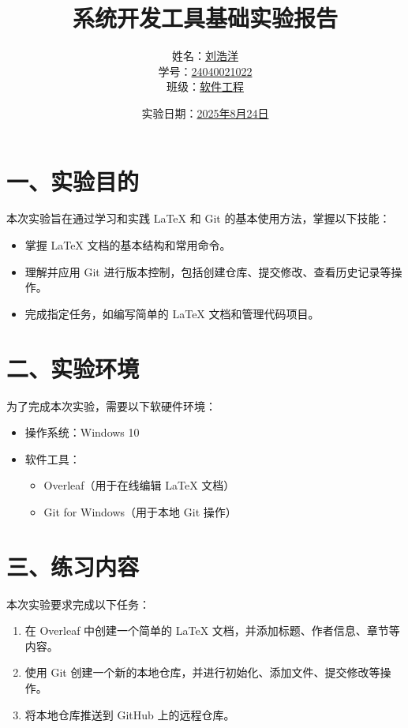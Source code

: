 \documentclass[a4paper, 12pt]{article}
\begin{document}
\title{\huge{系统开发工具基础实验报告}}
\author{姓名：\underline{刘浩洋} \\ 
        学号：\underline{24040021022} \\ 
        班级：\underline{软件工程}}
\date{实验日期：\underline{2025年8月24日}}
\maketitle

\section*{一、实验目的}
本次实验旨在通过学习和实践 LaTeX 和 Git 的基本使用方法，掌握以下技能：
\begin{itemize}
    \item 掌握 LaTeX 文档的基本结构和常用命令。
    \item 理解并应用 Git 进行版本控制，包括创建仓库、提交修改、查看历史记录等操作。
    \item 完成指定任务，如编写简单的 LaTeX 文档和管理代码项目。
\end{itemize}

\section*{二、实验环境}
为了完成本次实验，需要以下软硬件环境：
\begin{itemize}
    \item 操作系统：Windows 10
    \item 软件工具：
    \begin{itemize}
        \item Overleaf（用于在线编辑 LaTeX 文档）
        \item Git for Windows（用于本地 Git 操作）
    \end{itemize}
\end{itemize}

\section*{三、练习内容}
本次实验要求完成以下任务：
\begin{enumerate}
    \item 在 Overleaf 中创建一个简单的 LaTeX 文档，并添加标题、作者信息、章节等内容。
    \item 使用 Git 创建一个新的本地仓库，并进行初始化、添加文件、提交修改等操作。
    \item 将本地仓库推送到 GitHub 上的远程仓库。
\end{enumerate}
\end{document}
